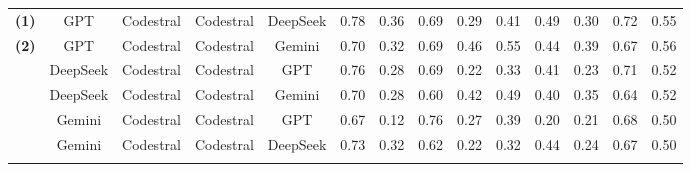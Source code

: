 \documentclass[authoryear,final,5p,times,twocolumn]{elsarticle}
\theoremstyle{plain}
\begin{document}
\begin{table}[p]
{\begin{tabular}{
>{\centering\arraybackslash}l
*{13}{>{\centering\arraybackslash}c}
}
\hypertarget{case1}{\textbf{(1)}} & \cellcolor{blue!20}GPT & \cellcolor{blue!20}Codestral & \cellcolor{blue!20}Codestral & \cellcolor{blue!20}DeepSeek & \cellcolor{green!18}0.78 & \cellcolor{red!11}0.36 & \cellcolor{orange!17}0.69 & \cellcolor{orange!14}0.29 & \cellcolor{green!11}0.41 & \cellcolor{green!13}0.49 & \cellcolor{orange!18}0.30 & \cellcolor{green!15}0.72 & \cellcolor{green!14}0.55 \label{Case:1}\\
\hypertarget{case2}{\textbf{(2)}} & \cellcolor{blue!20}GPT & \cellcolor{blue!20}Codestral & \cellcolor{blue!20}Codestral & \cellcolor{blue!20}Gemini & \cellcolor{green!15}0.70 & \cellcolor{red!13}0.32 & \cellcolor{orange!17}0.69 & \cellcolor{green!16}0.46 & \cellcolor{green!19}0.55 & \cellcolor{green!10}0.44 & \cellcolor{orange!12}0.39 & \cellcolor{green!12}0.67 & \cellcolor{green!15}0.56 \label{Case:2}\\
& DeepSeek & Codestral & Codestral & GPT & \cellcolor{green!17}0.76 & \cellcolor{red!14}0.28 & \cellcolor{orange!17}0.69 & \cellcolor{orange!18}0.22 & \cellcolor{orange!14}0.33 & \cellcolor{orange!11}0.41 & \cellcolor{red!12}0.23 & \cellcolor{green!15}0.71 & \cellcolor{green!11}0.52 \\
& DeepSeek & Codestral & Codestral & Gemini & \cellcolor{green!15}0.70 & \cellcolor{red!14}0.28 & \cellcolor{red!14}0.60 & \cellcolor{green!14}0.42 & \cellcolor{green!16}0.49 & \cellcolor{orange!12}0.40 & \cellcolor{orange!14}0.35 & \cellcolor{green!11}0.64 & \cellcolor{green!11}0.52 \\
& Gemini & Codestral & Codestral & GPT & \cellcolor{green!14}0.67 & \cellcolor{red!20}0.12 & \cellcolor{orange!11}0.76 & \cellcolor{orange!15}0.27 & \cellcolor{orange!10}0.39 & \cellcolor{red!17}0.20 & \cellcolor{red!14}0.21 & \cellcolor{green!13}0.68 & \cellcolor{orange!10}0.50 \\
& Gemini & Codestral & Codestral & DeepSeek & \cellcolor{green!16}0.73 & \cellcolor{red!13}0.32 & \cellcolor{red!12}0.62 & \cellcolor{orange!18}0.22 & \cellcolor{orange!14}0.32 & \cellcolor{green!10}0.44 & \cellcolor{red!12}0.24 & \cellcolor{green!12}0.67 & \cellcolor{orange!10}0.50 \\
\addlinespace[1.5ex]


\end{tabular}}
\end{table}
\end{document}

